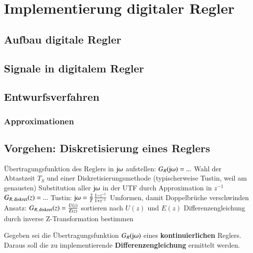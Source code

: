 \section{Implementierung digitaler Regler}


\subsection{Aufbau digitale Regler}

\subsection{Signale in digitalem Regler}


\subsection{Entwurfsverfahren}


\subsubsection{Approximationen} %



\subsection{Vorgehen: Diskretisierung eines Reglers}

\begin{outline}
    \1 Übertragungsfunktion des Reglers in $\mathrm{j} \omega$ aufstellen: $G_R(\mathrm{j} \omega) = ...$
    \1 Wahl der Abtastzeit $T_S$ und einer Diskretisierungsmethode
        \2 (typischerweise Tustin, weil am genausten)
    \1 Substitution aller $\mathrm{j} \omega$ in der UTF durch Approximation in $z^{-1}$ \textrightarrow\ $G_{R, \, \rm diskret}(z) = ...$
        \2 Tustin: $\mathrm{j} \omega = \frac{2}{T} \frac{1 - z^{-1}}{1 + z^{-1}}$
    \1 Umformen, damit Doppelbrüche verschwinden
    \1 Ansatz: $G_{R, \, \rm diskret}(z) = \frac{U(z)}{E(z)}$ sortieren nach $U(z)$ und $E(z)$
    \1 Differenzengleichung durch inverse Z-Transformation bestimmen
\end{outline}



Gegeben sei die Übertragungsfunktion $G_R(\mathrm{j} \omega)$ eines \textbf{kontinuierlichen} Reglers.
Daraus soll die zu implementierende \textbf{Differenzengleichung} ermittelt werden.

